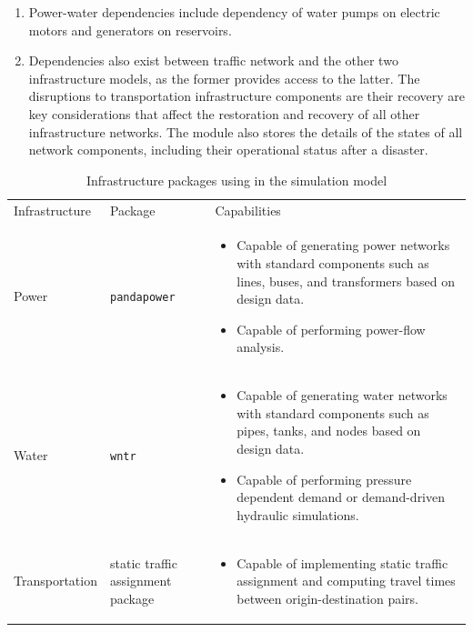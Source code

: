 \documentclass[letterpaper,12pt,english]{sphinxmanual}
\begin{document}
\begin{enumerate}[noitemsep]
\item Power-water dependencies include dependency of water pumps on electric motors and generators on reservoirs.
\item Dependencies also exist between traffic network and the other two infrastructure models, as the former provides access to the latter. The disruptions to transportation infrastructure components are their recovery are key considerations that affect the restoration and recovery of all other infrastructure networks. The module also stores the details of the states of all network components, including their operational status after a disaster.

\end{enumerate}

\begin{table}[htbp]
	\caption{Infrastructure packages using in the simulation model}
	\begin{tabular}{p{}p{}p{}}
		\cellcolor[HTML]{C0C0C0}Infrastructure & \cellcolor[HTML]{C0C0C0}Package & \cellcolor[HTML]{C0C0C0}Capabilities\\ 
		Power & \texttt{pandapower} & 
		\begin{minipage}[t]{0.6\textwidth}
			\begin{itemize}[leftmargin=6pt,noitemsep,nolistsep,after=\strut]
				\item Capable of generating power networks with standard components such as lines, buses, and transformers based on design data.
				\item Capable of performing power-flow analysis.
			\end{itemize}
		\end{minipage} \\
		\cellcolor[HTML]{EFEFEF}Water & \cellcolor[HTML]{EFEFEF}\texttt{wntr} & \cellcolor[HTML]{EFEFEF}\begin{minipage}[t]{0.6\textwidth}
			\begin{itemize}[leftmargin=6pt,noitemsep,nolistsep,after=\strut]
				\item Capable of generating water networks with standard components such as pipes, tanks, and nodes based on design data.
				\item Capable of performing pressure dependent demand or demand-driven hydraulic simulations.
			\end{itemize}
		\end{minipage} \\
		Transportation & static traffic assignment package & 
		\begin{minipage}[t]{0.6\textwidth}
			\begin{itemize}[leftmargin=6pt,noitemsep,nolistsep,after=\strut]
				\item Capable of implementing static traffic assignment and computing travel times between origin-destination pairs.
			\end{itemize}
		\end{minipage} \\
		\end{tabular}
	\label{tab:infra_packages}
	\end{table}
\end{document}
